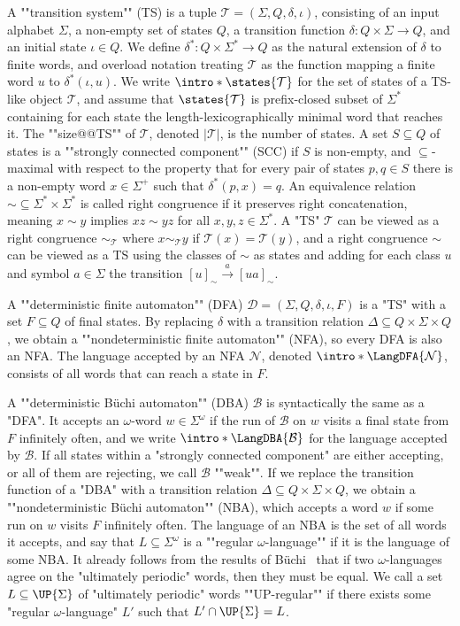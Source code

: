 \documentclass[a4paper,USenglish,cleveref,autoref,thm-restate]{lipics-v2021}
\newcommand{\mc}[1]{\ensuremath{\mathcal{#1}}}
\newcommand{\T}{\mc{T}}
\newcommand{\N}{\mc{N}}
\newcommand{\D}{\mc{D}}
\newcommand{\B}{\mc{B}}
\begin{document}
\AP
A ""transition system"" (TS) is a tuple $\T = (\Sigma, Q, \delta, \iota)$, consisting of an input alphabet $\Sigma$, a non-empty set of states $Q$, a transition function $\delta : Q \times \Sigma \to Q$, and an initial state $\iota \in Q$.
We define $\delta^* : Q \times \Sigma^* \to Q$ as the natural extension of $\delta$ to finite words, and overload notation treating $\T$ as the function mapping a finite word $u$ to $\delta^*(\iota, u)$.
\AP
We write $\intro*\states{\T}$ for the set of states of a TS-like object $\T$, and assume that $\states{\T}$ is prefix-closed subset of $\Sigma^*$ containing for each state the length-lexicographically minimal word that reaches it.
\AP
The ""size@@TS"" of $\T$, denoted $|\T|$, is the number of states.
\AP
A set $S \subseteq Q$ of states is a ""strongly connected component"" (SCC) if $S$ is non-empty, and $\subseteq$-maximal with respect to the property that for every pair of states $p, q \in S$ there is a non-empty word $x \in \Sigma^+$ such that $\delta^*(p, x) = q$.
\AP
An equivalence relation ${\sim} \subseteq \Sigma^* \times \Sigma^*$ is called right congruence if it preserves right concatenation, meaning $x \sim y$ implies $xz \sim yz$ for all $x,y,z \in \Sigma^*$.
\AP
A "TS" $\T$ can be viewed as a right congruence $\sim_\T$ where $x \sim_\T y$ if $\T(x) = \T(y)$, and a right congruence $\sim$ can be viewed as a TS using the classes of $\sim$ as states and adding for each class $u$ and symbol $a \in \Sigma$ the transition $[u]_\sim \xrightarrow{a} [ua]_\sim$.

\AP
A ""deterministic finite automaton"" (DFA) $\D = (\Sigma, Q, \delta, \iota, F)$ is a "TS" with a set $F \subseteq Q$ of final states.
By replacing $\delta$ with a transition relation $\Delta \subseteq Q \times \Sigma \times Q$, we obtain a ""nondeterministic finite automaton"" (NFA), so every DFA is also an NFA.
\AP
The language accepted by an NFA $\N$, denoted $\intro*\LangDFA{\N}$, consists of all words that can reach a state in $F$.

\AP
A ""deterministic Büchi automaton"" (DBA) $\B$ is syntactically the same as a "DFA".
It accepts an $\omega$-word $w \in \Sigma^\omega$ if the run of $\B$ on $w$ visits a final state from $F$ infinitely often, and we write $\intro*\LangDBA{\B}$ for the language accepted by $\B$.
\AP
If all states within a "strongly connected component" are either accepting, or all of them are rejecting, we call $\B$ ""weak"".
\AP
If we replace the transition function of a "DBA" with a transition relation $\Delta \subseteq Q \times \Sigma \times Q$, we obtain a ""nondeterministic Büchi automaton"" (NBA), which accepts a word $w$ if some run on $w$ visits $F$ infinitely often.
\AP
The language of an NBA is the set of all words it accepts, and say that $L \subseteq \Sigma^\omega$ is a ""regular $\omega$-language"" if it is the language of some NBA.
It already follows from the results of Büchi~\cite{Buchi62} that if two $\omega$-languages agree on the "ultimately periodic" words, then they must be equal.
\AP
We call a set $L\subseteq \UP{\Sigma}$ of "ultimately periodic" words ""UP-regular"" if there exists some "regular $\omega$-language" $L'$ such that $L' \cap \UP{\Sigma} = L$.
\end{document}
